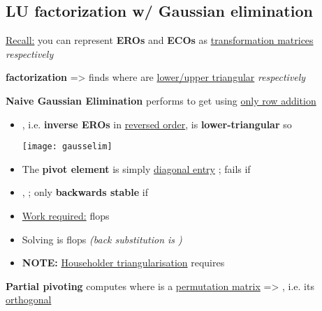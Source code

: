 \subsection*{LU factorization w/ Gaussian elimination}

\underline{Recall:} you can represent \textbf{EROs} and
\textbf{ECOs} as \underline{transformation matrices} 
\emph{respectively}

\textbf{ factorization} => finds 
where  are \underline{lower/upper triangular} \emph{respectively}

\hSep %

\textbf{Naive Gaussian Elimination} performs
\iMbox{ [I_{m} \ | \ A \ | \ I_{n}] \rightsquigarrow [R^{-1} \ | \ U \ | \ I_{n}]}
to get  using \underline{only row addition}
\begin{itemize}
      \item
            , i.e. \textbf{inverse EROs} in \underline{reversed order}, is
            \textbf{lower-triangular} so 

            \texttt{[image: gausselim]}
      \item
            The \textbf{pivot element} is simply \underline{diagonal entry}
            ; fails if
      \item
            ,
            ;
            only \textbf{backwards stable} if
      \item
            \underline{Work required:}  flops
      \item
            Solving  is  flops
            \emph{(back substitution is )}
      \item
            \textbf{NOTE:} \underline{Householder triangularisation} requires
\end{itemize}

\hSep %

\textbf{Partial pivoting} computes  where  is
a \underline{permutation matrix} => , i.e. its \underline{orthogonal}

